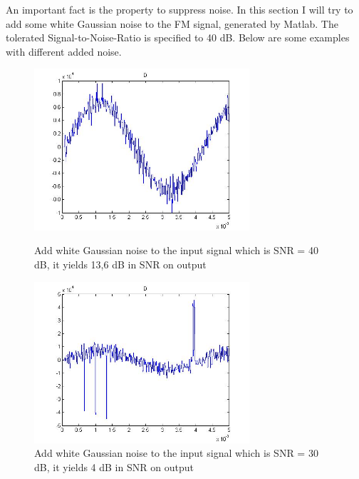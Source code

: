An important fact is the property to suppress noise. In this section I will try to add some white Gaussian noise to the FM signal, generated by Matlab. The tolerated Signal-to-Noise-Ratio is specified to 40 dB. Below are some examples with different added noise.


\begin{figure}  
\begin{minipage}[t]{4.5cm}  
\begin{center}  
\includegraphics[width=8.0cm,clip]{images/13dBy.jpg}  
\caption[]{\label{fig:pure} Add white Gaussian noise to the input signal which is SNR = 40 dB, it yields 13,6 dB in SNR on output}  
\end{center}  
\end{minipage}  
\hfill  
\begin{minipage}[t]{7.5cm}  
\begin{center}  
\includegraphics[width=8.0cm,clip]{images/noise4.jpg}  
\caption[Short caption for figure 2]{\label{fig:pure2} Add white Gaussian noise to the input signal which is SNR = 30 dB, it yields 4 dB in SNR on output}  
\end{center}  
\end{minipage}  
\end{figure}



